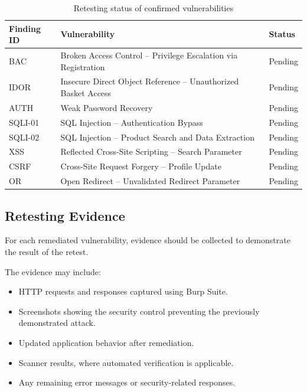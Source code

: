 \begin{table}[H]
\centering
\renewcommand{\arraystretch}{1.3}
\begin{tabular}{|l|p{6cm}|l|}
\hline
\textbf{Finding ID} & \textbf{Vulnerability} & \textbf{Status} \\
\hline
BAC &
Broken Access Control -- Privilege Escalation via Registration &
Pending \\
\hline
IDOR &
Insecure Direct Object Reference -- Unauthorized Basket Access &
Pending \\
\hline
AUTH &
Weak Password Recovery &
Pending \\
\hline
SQLI-01 &
SQL Injection -- Authentication Bypass &
Pending \\
\hline
SQLI-02 &
SQL Injection -- Product Search and Data Extraction &
Pending \\
\hline
XSS &
Reflected Cross-Site Scripting -- Search Parameter &
Pending \\
\hline
CSRF &
Cross-Site Request Forgery -- Profile Update &
Pending \\
\hline
OR &
Open Redirect -- Unvalidated Redirect Parameter &
Pending \\
\hline
\end{tabular}
\caption{Retesting status of confirmed vulnerabilities}
\end{table}

\subsection*{Retesting Evidence}

For each remediated vulnerability, evidence should be collected to
demonstrate the result of the retest.

The evidence may include:

\begin{itemize}

    \item HTTP requests and responses captured using Burp Suite.

    \item Screenshots showing the security control preventing the
    previously demonstrated attack.

    \item Updated application behavior after remediation.

    \item Scanner results, where automated verification is
    applicable.

    \item Any remaining error messages or security-related responses.

\end{itemize}

